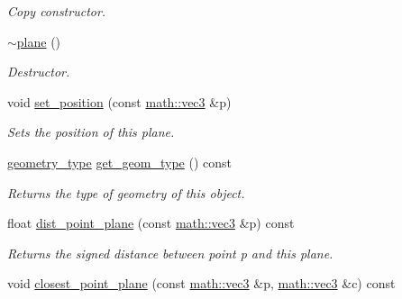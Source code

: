 \begin{DoxyCompactItemize}
\begin{DoxyCompactList}\small\item\em Copy constructor. \end{DoxyCompactList}\item 
\mbox{\label{classphysim_1_1geometry_1_1plane_ac0ff0b6aa25321b706e9c146ed117330}} 
\hyperlink{classphysim_1_1geometry_1_1plane_ac0ff0b6aa25321b706e9c146ed117330}{$\sim$plane} ()
\begin{DoxyCompactList}\small\item\em Destructor. \end{DoxyCompactList}\item 
void \hyperlink{classphysim_1_1geometry_1_1plane_a9de66b1c50ea9d34a8142e0a48751692}{set\+\_\+position} (const \hyperlink{structphysim_1_1math_1_1vec3}{math\+::vec3} \&p)
\begin{DoxyCompactList}\small\item\em Sets the position of this plane. \end{DoxyCompactList}\item 
\mbox{\label{classphysim_1_1geometry_1_1plane_aecd37177ec22498893b7ef2395739aac}} 
\hyperlink{namespacephysim_1_1geometry_a60e1ee7ea6f443f8ec9341ca7f12f1b7}{geometry\+\_\+type} \hyperlink{classphysim_1_1geometry_1_1plane_aecd37177ec22498893b7ef2395739aac}{get\+\_\+geom\+\_\+type} () const
\begin{DoxyCompactList}\small\item\em Returns the type of geometry of this object. \end{DoxyCompactList}\item 
float \hyperlink{classphysim_1_1geometry_1_1plane_a508d6f69330663a1c2d02a3ca7ac2762}{dist\+\_\+point\+\_\+plane} (const \hyperlink{structphysim_1_1math_1_1vec3}{math\+::vec3} \&p) const
\begin{DoxyCompactList}\small\item\em Returns the signed distance between point {\itshape p} and this plane. \end{DoxyCompactList}\item 
\mbox{\label{classphysim_1_1geometry_1_1plane_a8a846e38a4791511df410f5720b9d1fd}} 
void \hyperlink{classphysim_1_1geometry_1_1plane_a8a846e38a4791511df410f5720b9d1fd}{closest\+\_\+point\+\_\+plane} (const \hyperlink{structphysim_1_1math_1_1vec3}{math\+::vec3} \&p, \hyperlink{structphysim_1_1math_1_1vec3}{math\+::vec3} \&c) const

\end{DoxyCompactItemize}
